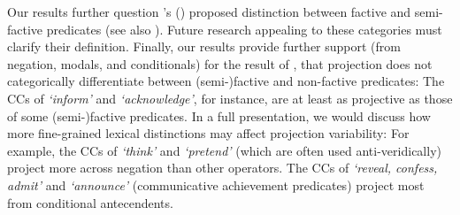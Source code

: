 \documentclass[11pt, a4paper]{article}
\newcommand{\posscite}[1]{\citeauthor{#1}'s (\citeyear{#1})}
\begin{document}
	Our results further question \posscite{karttunen_observations_1971} proposed distinction between factive and semi-factive predicates (see also \citealt{beaver_have_2010,sieker_projective_2022}).
	Future research appealing to these categories must clarify their definition. 
	Finally, our results provide further support (from negation, modals, and conditionals) for the result of \citet{degen_are_2022}, that projection does not categorically differentiate between (semi-)factive and non-factive predicates: The CCs of \emph{\lq inform\rq} and \emph{\lq acknowledge\rq}, for instance, are at least as projective as those of some (semi-)factive predicates.
	In a full presentation, we would discuss how more fine-grained lexical distinctions may affect projection variability: For example, the CCs of \emph{\lq think\rq} and \emph{\lq pretend\rq} (which are often used anti-veridically) project more across negation than other operators. The CCs of \emph{\lq reveal, confess, admit\rq} and \emph{\lq announce\rq} (communicative achievement predicates) project most from conditional antecendents.
	
\end{document}
